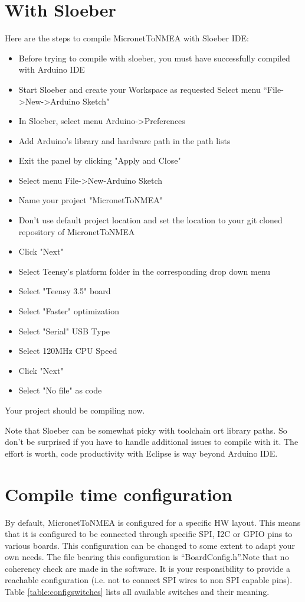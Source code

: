 \documentclass{report}
\begin{document}
\section{With Sloeber}

Here are the steps to compile MicronetToNMEA with Sloeber IDE:

\begin{itemize}
\item Before trying to compile with sloeber, you must have successfully compiled with Arduino IDE
\item Start Sloeber and create your Workspace as requested Select menu “File->New->Arduino Sketch"
\item In Sloeber, select menu Arduino->Preferences
\item Add Arduino's library and hardware path in the path lists
\item Exit the panel by clicking "Apply and Close"
\item Select menu File->New-Arduino Sketch
\item Name your project "MicronetToNMEA"
\item Don't use default project location and set the location to your git cloned repository of MicronetToNMEA
\item Click "Next"
\item Select Teensy's platform folder
in the corresponding drop down menu
\item Select "Teensy 3.5" board
\item Select "Faster" optimization
\item Select "Serial" USB Type
\item Select 120MHz CPU Speed
\item Click "Next"
\item Select "No file" as code
\end{itemize}

Your project should be compiling now.

Note that Sloeber can be somewhat picky with toolchain ort library paths. So don’t be surprised if you have to handle additional issues to compile with it. The effort is worth, code productivity with Eclipse is way beyond Arduino IDE.

\section{Compile time configuration}

By default, MicronetToNMEA is configured for a specific HW layout. This means that it is configured to be connected through specific SPI, I2C or GPIO pins to various boards. This configuration can be changed to some extent to adapt your own needs. The file bearing this configuration is “BoardConfig.h”.Note that no coherency check are made in the software. It is your responsibility to provide a reachable configuration (i.e. not to connect SPI wires to non SPI capable pins). Table {\ref{table:configswitches}} lists all available switches and their meaning.
\end{document}
